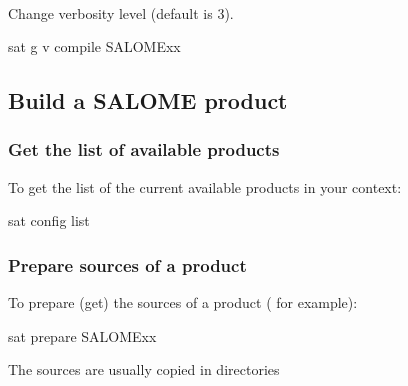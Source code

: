 \documentclass[a4paper,10pt,english]{sphinxmanual}
\begin{document}
\paragraph{}
\label{\detokenize{usage_of_sat:verbose-or-v}}
Change verbosity level (default is 3).

%
\begin{sphinxVerbatim}[commandchars=\\\{\}]
sat \PYGZhy{}g \PYGZhy{}v  compile SALOME\PYGZus{}xx
\end{sphinxVerbatim}


\subsection{Build a SALOME product}
\label{\detokenize{usage_of_sat:build-a-salome-product}}

\subsubsection{Get the list of available products}
\label{\detokenize{usage_of_sat:get-the-list-of-available-products}}
To get the list of the current available products in your context:

%
\begin{sphinxVerbatim}[commandchars=\\\{\}]
sat config \PYGZhy{}\PYGZhy{}list
\end{sphinxVerbatim}


\subsubsection{Prepare sources of a product}
\label{\detokenize{usage_of_sat:prepare-sources-of-a-product}}
To prepare (get)  the sources of a product ( for example):

%
\begin{sphinxVerbatim}[commandchars=\\\{\}]
sat prepare SALOME\PYGZus{}xx
\end{sphinxVerbatim}

\begin{DUlineblock}{0em}
\item[] The sources are usually copied in directories
\item[] 
\end{DUlineblock}
\end{document}
